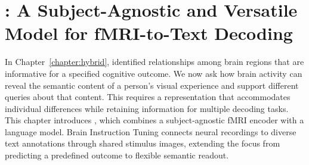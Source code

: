 \chapter{\mindllm{}: A Subject-Agnostic and Versatile Model for fMRI-to-Text Decoding}
\label{chapter:mindllm}

In Chapter~\ref{chapter:hybrid}, \hybrid{} identified relationships among brain regions that are informative for a specified cognitive outcome. We now ask how brain activity can reveal the semantic content of a person's visual experience and support different queries about that content. This requires a representation that accommodates individual differences while retaining information for multiple decoding tasks. This chapter introduces \mindllm{}, which combines a subject-agnostic fMRI encoder with a language model. Brain Instruction Tuning connects neural recordings to diverse text annotations through shared stimulus images, extending the focus from predicting a predefined outcome to flexible semantic readout.








